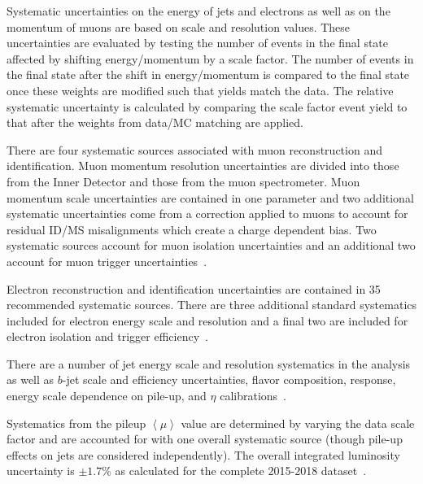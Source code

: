 Systematic uncertainties on the energy of jets and electrons as well as on the momentum of muons are based on scale and resolution values. These uncertainties are evaluated by testing the number of events in the final state affected by shifting energy/momentum by a scale factor. The number of events in the final state after the shift in energy/momentum is compared to the final state once these weights are modified such that yields match the data. The relative systematic uncertainty is calculated by comparing the scale factor event yield to that after the weights from data/MC matching are applied. 
 
There are four systematic sources associated with muon reconstruction and identification. Muon momentum resolution uncertainties are divided into those from the Inner Detector and those from the muon spectrometer. Muon momentum scale uncertainties are contained in one parameter and two additional systematic uncertainties come from a correction applied to muons to account for residual ID/MS misalignments which create a charge dependent bias. Two systematic sources account for muon isolation uncertainties and an additional two account for muon trigger uncertainties~\cite{MCPpaper}.  

Electron reconstruction and identification uncertainties are contained in 35 recommended systematic sources. There are three additional standard systematics included for electron energy scale and resolution and a final two are included for electron isolation and trigger efficiency~\cite{ElectronPhotonPerformance}.

There are a number of jet energy scale and resolution systematics in the analysis as well as $b$-jet scale and efficiency uncertainties, flavor composition, response, energy scale dependence on pile-up, and $\eta$ calibrations~\cite{JETEtmiss}.

Systematics from the pileup $\left<\mu\right>$ value are determined by varying the data scale factor and are accounted for with one overall systematic source (though pile-up effects on jets are considered independently). The overall integrated luminosity uncertainty is $\pm 1.7\%$ as calculated for the complete 2015-2018 dataset~\cite{ATLAS-CONF-2019-021}.


